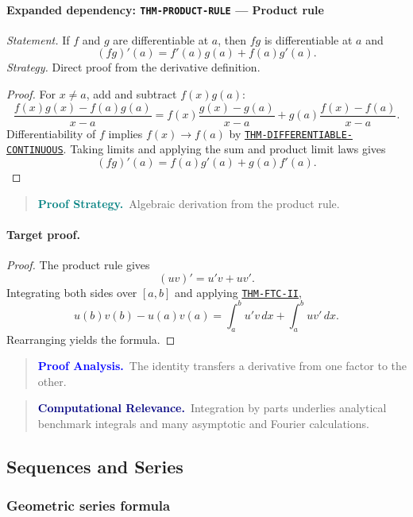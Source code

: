 \documentclass[10pt]{article}
\newcommand{\pidraw}[1]{\begingroup\urlstyle{tt}\nolinkurl{#1}\endgroup}
\newcommand{\pidref}[1]{\hyperref[prf:#1]{\pidraw{#1}}}
\newcommand{\pid}[1]{\pidref{#1}}
\theoremstyle{definition}
\theoremstyle{remark}
\newenvironment{proofstrategy}
{\begin{quote}\small\noindent\textbf{\textcolor{teal}{Proof Strategy.}}\ }
{\end{quote}}
\newenvironment{proofanalysis}
{\begin{quote}\small\noindent\textbf{\textcolor{blue}{Proof Analysis.}}\ }
{\end{quote}}
\newenvironment{computationalrelevance}
{\begin{quote}\small\noindent\textbf{\textcolor{navy}{Computational Relevance.}}\ }
{\end{quote}}
\begin{document}
\paragraph{Expanded dependency: \pidraw{THM-PRODUCT-RULE} --- Product rule}
\textit{Statement.} If $f$ and $g$ are differentiable at $a$, then $fg$ is differentiable at $a$ and
\[
(fg)'(a)=f'(a)g(a)+f(a)g'(a).
\]
\textit{Strategy.} Direct proof from the derivative definition.
\begin{proof}For $x\ne a$, add and subtract $f(x)g(a)$:
\[
\frac{f(x)g(x)-f(a)g(a)}{x-a}
=
f(x)\frac{g(x)-g(a)}{x-a}
+
g(a)\frac{f(x)-f(a)}{x-a}.
\]
Differentiability of $f$ implies $f(x)\to f(a)$ by
\pid{THM-DIFFERENTIABLE-CONTINUOUS}. Taking limits and applying the sum and
product limit laws gives
\[
(fg)'(a)=f(a)g'(a)+g(a)f'(a).
\]\end{proof}

\begin{proofstrategy}Algebraic derivation from the product rule.\end{proofstrategy}

\paragraph{Target proof.}

\begin{proof}

The product rule gives
\[
(uv)'=u'v+uv'.
\]
Integrating both sides over $[a,b]$ and applying \pid{THM-FTC-II},
\[
u(b)v(b)-u(a)v(a)
=
\int_a^b u'v\,dx+\int_a^b uv'\,dx.
\]
Rearranging yields the formula.

\end{proof}

\begin{proofanalysis}The identity transfers a derivative from one factor to the other.\end{proofanalysis}

\begin{computationalrelevance}Integration by parts underlies analytical benchmark integrals and many asymptotic and Fourier calculations.\end{computationalrelevance}

\subsection{Sequences and Series}

\subsubsection{Geometric series formula}
\end{document}
